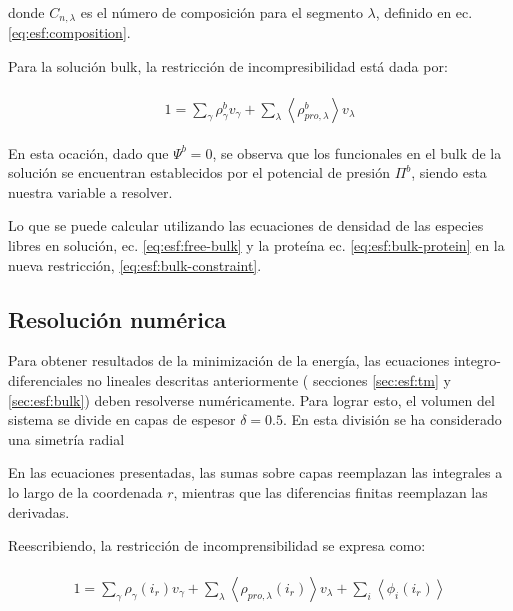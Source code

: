 donde $C_{n,\lambda}$ es el n\'umero de composici\'on para el segmento $\lambda$, definido en ec.  \ref{eq:esf:composition}.

Para la soluci\'on bulk, la restricci\'on de incompresibilidad est\'a dada por:

\begin{align}
	\begin{aligned}
		1= {\sum_{\gamma}\rho^b_\gamma v_\gamma + \sum_\lambda{\left<\rho^b_{pro,\lambda}\right>v_\lambda} }
	\end{aligned}
	\label{eq:esf:bulk-constraint}
\end{align}


En esta ocaci\'on, dado que $\Psi^b = 0$, se observa que los funcionales en el bulk de la soluci\'on se encuentran establecidos por el potencial de presi\'on $\Pi^b$, siendo esta nuestra variable a resolver.

Lo que se puede calcular utilizando las ecuaciones de densidad de las especies libres en soluci\'on, ec.  \ref{eq:esf:free-bulk} y la prote\'ina ec. \ref{eq:esf:bulk-protein} en la nueva restricci\'on, \ref{eq:esf:bulk-constraint}.


\subsection{Resoluci\'on num\'erica}


Para obtener resultados de la minimizaci\'on de la energ\'ia, las ecuaciones integro-diferenciales no lineales descritas anteriormente ( secciones \ref{sec:esf:tm} y \ref{sec:esf:bulk}) deben resolverse num\'ericamente. Para lograr esto, el volumen del sistema se divide en capas de espesor $\delta = 0.5$. En esta divisi\'on se ha considerado una simetr\'ia radial 

 En las ecuaciones presentadas, las sumas sobre capas reemplazan las integrales a lo largo de la coordenada $r$, mientras que las diferencias finitas reemplazan las derivadas.

Reescribiendo, la restricci\'on de incomprensibilidad se expresa como:

\begin{align}
	\begin{aligned}
		1=  {\sum_{\gamma}\rho_\gamma(i_r) v_\gamma + \sum_\lambda{\left<\rho_{pro,\lambda}(i_r)\right>v_\lambda} + \sum_i{\left<\phi_i(i_r)\right>}}
		\label{eq:esf:pi-ir}
	\end{aligned}
\end{align}

